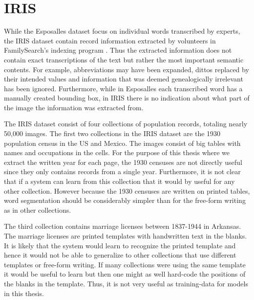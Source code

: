 \section{IRIS}

While the Esposalles dataset focus on individual words transcribed by experts, the IRIS dataset contain record information extracted by volunteers in FamilySearch's indexing program \cite{Iris}.
Thus the extracted information does not contain exact transcriptions of the text but rather the most important semantic contents.
For example, abbreviations may have been expanded, dittos replaced by their intended values and information that was deemed genealogically irrelevant has been ignored.
Furthermore, while in Esposalles each transcribed word has a manually created bounding box, in IRIS there is no indication about what part of the image the information was extracted from.

The IRIS dataset consist of four collections of population records, totaling nearly 50,000 images.
The first two collections in the IRIS dataset are the 1930 population census in the US and Mexico. The images consist of big tables with names and occupations in the cells.
For the purpose of this thesis where we extract the written year for each page, the 1930 censuses are not directly useful since they only contains records from a single year. Furthermore, it is not clear that if a system can learn from this collection that it would by useful for any other collection.
However because the 1930 censuses are written on printed tables, word segmentation should be considerably simpler than for the free-form writing as in other collections.

The third collection contains marriage licenses between 1837-1944 in Arkansas. The marriage licenses are printed templates with handwritten text in the blanks.
It is likely that the system would learn to recognize the printed template and hence it would not be able to generalize to other collections that use different templates or free-form writing. If many collections were using the same template it would be useful to learn but then one might as well hard-code the positions of the blanks in the template. Thus, it is not very useful as training-data for models in this thesis.

